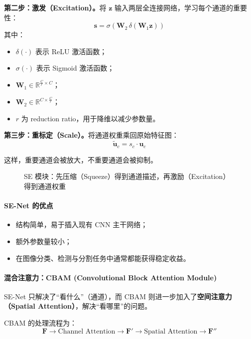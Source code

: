 \textbf{第二步：激发（Excitation）。}将 $\mathbf{z}$ 输入两层全连接网络，学习每个通道的重要性：
\begin{equation}
\mathbf{s} = \sigma\left(\mathbf{W}_2\,\delta(\mathbf{W}_1 \mathbf{z})\right)
\end{equation}
其中：
\begin{itemize}
    \item $\delta(\cdot)$ 表示 ReLU 激活函数；
    \item $\sigma(\cdot)$ 表示 Sigmoid 激活函数；
    \item $\mathbf{W}_1 \in \mathbb{R}^{\frac{C}{r}\times C}$；
    \item $\mathbf{W}_2 \in \mathbb{R}^{C\times \frac{C}{r}}$；
    \item $r$ 为 reduction ratio，用于降维以减少参数量。
\end{itemize}

\textbf{第三步：重标定（Scale）。}将通道权重乘回原始特征图：
\begin{equation}
\tilde{\mathbf{u}}_c = s_c \cdot \mathbf{u}_c
\end{equation}

这样，重要通道会被放大，不重要通道会被抑制。

\begin{figure}[H]
  \centering
  
  \caption{SE 模块：先压缩（Squeeze）得到通道描述，再激励（Excitation）得到通道权重}
  \label{fig:ch09_orig13}
\end{figure}

\paragraph{SE-Net 的优点}
\begin{itemize}
    \item 结构简单，易于插入现有 CNN 主干网络；
    \item 额外参数量较小；
    \item 在图像分类、检测与分割任务中通常都能获得稳定收益。
\end{itemize}

\paragraph{混合注意力：CBAM (Convolutional Block Attention Module)}
SE-Net 只解决了“看什么”（通道），而 CBAM 则进一步加入了\textbf{空间注意力（Spatial Attention）}，解决“看哪里”的问题。

CBAM 的处理流程为：
\[
\mathbf{F}
\rightarrow
\text{Channel Attention}
\rightarrow
\mathbf{F}'
\rightarrow
\text{Spatial Attention}
\rightarrow
\mathbf{F}''
\]

